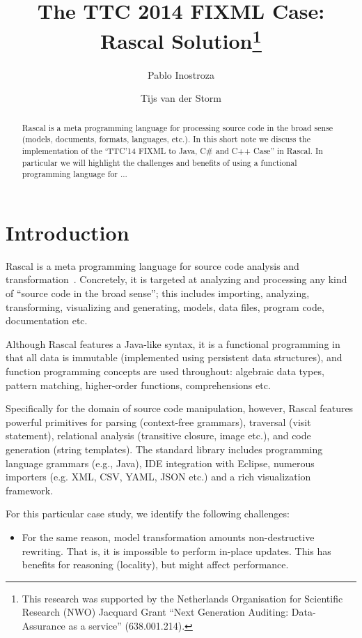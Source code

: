 \documentclass[submission,copyright,creativecommons]{eptcs}
\title{The TTC 2014 FIXML Case: Rascal Solution\thanks{This
    research was supported by the Netherlands Organisation for
    Scientific Research (NWO) Jacquard Grant ``Next Generation
    Auditing: Data-Assurance as a service'' (638.001.214).}}
\author{Pablo Inostroza \\
\institute{Centrum Wiskunde \&\ Informatica (CWI)\\ Amsterdam, The Netherlands}
\email{\href{mailto:pvaldera@cwi.nl}{pvaldera@cwi.nl}}
\and Tijs van der Storm\\
\institute{Centrum Wiskunde \&\ Informatica (CWI)\\ Amsterdam, The Netherlands}
\email{\href{mailto:storm@cwi.nl}{storm@cwi.nl}}
}
\begin{document}
\maketitle

\begin{abstract}
Rascal is a meta programming language for processing source code in the broad sense (models, documents, formats, languages, etc.). In this short note we discuss the implementation of the `TTC'14 FIXML to Java, C\# and C++ Case'' in Rascal. In particular we will highlight the challenges and benefits of using a functional programming language for ...
\end{abstract}

\section{Introduction}

Rascal is a meta programming language for source code analysis and transformation~\cite{Rascal,RascalGTTSE}. 
Concretely, it is targeted at analyzing and processing any kind of ``source code in the broad sense''; this includes importing, analyzing, transforming, visualizing and generating, models, data files, program code, documentation etc.
 
Although Rascal features a Java-like syntax, it is a functional programming in that all data is immutable (implemented using persistent data structures), and function programming concepts are used throughout: algebraic data types, pattern matching, higher-order functions, comprehensions etc. 

Specifically for the domain of source code manipulation, however, Rascal features powerful primitives for parsing (context-free grammars), traversal (visit statement), relational analysis (transitive closure, image etc.), and code generation (string templates). 
The standard library includes programming language grammars (e.g., Java), IDE integration
with Eclipse, numerous importers (e.g. XML, CSV, YAML, JSON etc.) and a rich visualization framework. 

For this particular case study, we identify the following challenges:
\begin{itemize}
\item For the same reason, model transformation amounts  non-destructive rewriting. That is, it is impossible to perform in-place updates. This has benefits for reasoning (locality), but might affect performance.
\end{itemize}
\end{document}
